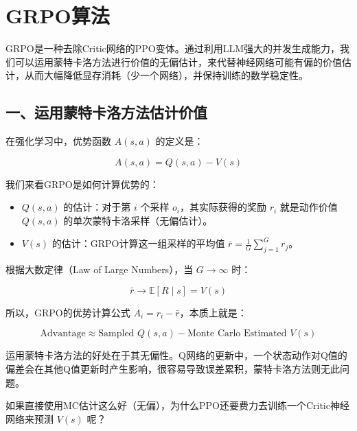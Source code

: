 \setcounter{section}{6}

\hypertarget{grpoux7b97ux6cd5}{%
\section{GRPO算法}\label{grpoux7b97ux6cd5}}

GRPO是一种去除Critic网络的PPO变体。通过利用LLM强大的并发生成能力，我们可以运用蒙特卡洛方法进行价值的无偏估计，来代替神经网络可能有偏的价值估计，从而大幅降低显存消耗（少一个网络），并保持训练的数学稳定性。

\hypertarget{ux4e00ux8fd0ux7528ux8499ux7279ux5361ux6d1bux65b9ux6cd5ux4f30ux8ba1ux4ef7ux503c}{%
\subsection{一、运用蒙特卡洛方法估计价值}\label{ux4e00ux8fd0ux7528ux8499ux7279ux5361ux6d1bux65b9ux6cd5ux4f30ux8ba1ux4ef7ux503c}}

在强化学习中，优势函数 \(A(s,a)\) 的定义是：

\[
A(s,a)=Q(s,a)-V(s)
\]

我们来看GRPO是如何计算优势的：

\begin{itemize}
\tightlist
\item
  \(Q(s,a)\) 的估计：对于第 \(i\) 个采样 \(o_i\)，其实际获得的奖励 \(r_i\) 就是动作价值 \(Q(s,a)\) 的单次蒙特卡洛采样（无偏估计）。
\item
  \(V(s)\) 的估计：GRPO计算这一组采样的平均值 \(\bar{r}=\frac{1}{G}\sum_{j=1}^{G}r_j\)。
\end{itemize}

根据大数定律（Law of Large Numbers），当 \(G\to\infty\) 时：

\[
\bar{r}\to \mathbb{E}[R\mid s]=V(s)
\]

所以，GRPO的优势计算公式 \(A_i=r_i-\bar{r}\)，本质上就是：

\[
\text{Advantage}\approx \text{Sampled }Q(s,a)-\text{Monte Carlo Estimated }V(s)
\]

运用蒙特卡洛方法的好处在于其无偏性。Q网络的更新中，一个状态动作对Q值的偏差会在其他Q值更新时产生影响，很容易导致误差累积，蒙特卡洛方法则无此问题。

如果直接使用MC估计这么好（无偏），为什么PPO还要费力去训练一个Critic神经网络来预测 \(V(s)\) 呢？

